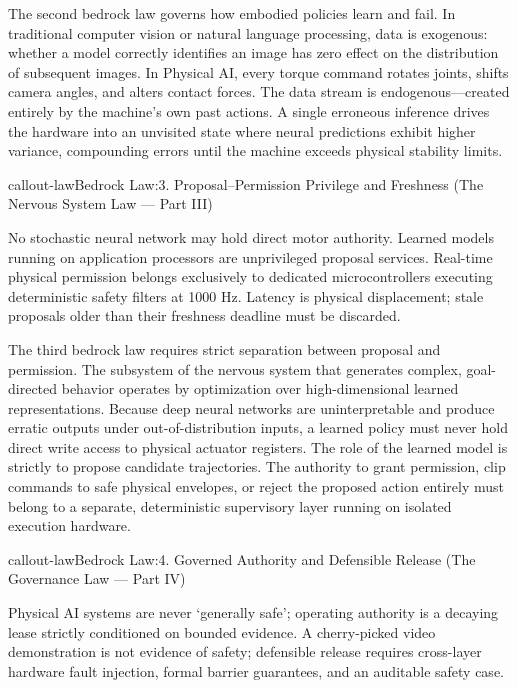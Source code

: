 \documentclass[
  10pt,
  letterpaper,
  twoside,
  openright,
  numbers=noenddot,
  headings=standardclasses
]{scrbook}
\begin{document}
The second bedrock law governs how embodied policies learn and fail. In
traditional computer vision or natural language processing, data is
exogenous: whether a model correctly identifies an image has zero effect
on the distribution of subsequent images. In Physical AI, every torque
command rotates joints, shifts camera angles, and alters contact forces.
The data stream is endogenous---created entirely by the machine's own
past actions. A single erroneous inference drives the hardware into an
unvisited state where neural predictions exhibit higher variance,
compounding errors until the machine exceeds physical stability limits.

\protect{}\label{callout-lawux2a-1.8}
\begin{fbxSimple}{callout-law}{Bedrock Law:}{3. Proposal–Permission Privilege and Freshness (The Nervous System Law — Part III)}
\label{callout-law*-1.8}

No stochastic neural network may hold direct motor authority. Learned
models running on application processors are unprivileged proposal
services. Real-time physical permission belongs exclusively to dedicated
microcontrollers executing deterministic safety filters at 1000 Hz.
Latency is physical displacement; stale proposals older than their
freshness deadline must be discarded.

\end{fbxSimple}

The third bedrock law requires strict separation between proposal and
permission. The subsystem of the nervous system that generates complex,
goal-directed behavior operates by optimization over high-dimensional
learned representations. Because deep neural networks are
uninterpretable and produce erratic outputs under out-of-distribution
inputs, a learned policy must never hold direct write access to physical
actuator registers. The role of the learned model is strictly to propose
candidate trajectories. The authority to grant permission, clip commands
to safe physical envelopes, or reject the proposed action entirely must
belong to a separate, deterministic supervisory layer running on
isolated execution hardware.

\protect{}\label{callout-lawux2a-1.9}
\begin{fbxSimple}{callout-law}{Bedrock Law:}{4. Governed Authority and Defensible Release (The Governance Law — Part IV)}
\label{callout-law*-1.9}

Physical AI systems are never `generally safe'; operating authority is a
decaying lease strictly conditioned on bounded evidence. A cherry-picked
video demonstration is not evidence of safety; defensible release
requires cross-layer hardware fault injection, formal barrier
guarantees, and an auditable safety case.

\end{fbxSimple}
\end{document}
